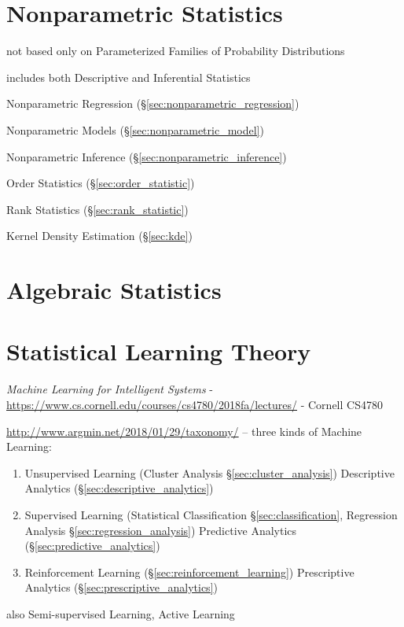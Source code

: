 \section{Nonparametric Statistics}\label{sec:nonparametric_statistics}

not based only on Parameterized Families of Probability Distributions

includes both Descriptive and Inferential Statistics

Nonparametric Regression (\S\ref{sec:nonparametric_regression})

Nonparametric Models (\S\ref{sec:nonparametric_model})

Nonparametric Inference (\S\ref{sec:nonparametric_inference})

Order Statistics (\S\ref{sec:order_statistic})

Rank Statistics (\S\ref{sec:rank_statistic})

Kernel Density Estimation (\S\ref{sec:kde})



\section{Algebraic Statistics}\label{sec:algebraic_statistics}

\section{Statistical Learning Theory}\label{sec:statistical_learning_theory}

\emph{Machine Learning for Intelligent Systems} -
\url{https://www.cs.cornell.edu/courses/cs4780/2018fa/lectures/} -
Cornell CS4780

\url{http://www.argmin.net/2018/01/29/taxonomy/} -- three kinds of Machine
Learning:
\begin{enumerate}
  \item Unsupervised Learning (Cluster Analysis \S\ref{sec:cluster_analysis})
    \fist Descriptive Analytics (\S\ref{sec:descriptive_analytics})
  \item Supervised Learning (Statistical Classification
    \S\ref{sec:classification}, Regression Analysis
    \S\ref{sec:regression_analysis}) \fist Predictive Analytics
    (\S\ref{sec:predictive_analytics})
  \item Reinforcement Learning (\S\ref{sec:reinforcement_learning})
    \fist Prescriptive Analytics (\S\ref{sec:prescriptive_analytics})
\end{enumerate}
also Semi-supervised Learning, Active Learning




